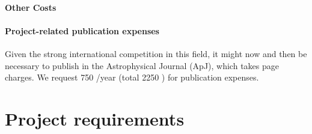 \documentclass[10pt,fleqn,twoside]{article}
\begin{document}
\paragraph{Other Costs}

\paragraph{Project-related publication expenses}
Given the strong international competition in this field, it might now
and then be necessary to publish in the Astrophysical Journal (ApJ),
which takes page charges. 
We request 750 \EUR{}/year (total 2250 \EUR{}) for publication expenses.



% 
% 
% 
% 
% 
% 
% 
% 
% 
% 
% 
% 

\section{Project requirements}
\renewcommand{\leftmark}{\sc Project requirements}
\end{document}
